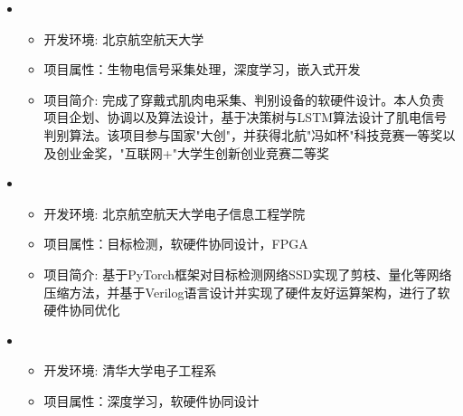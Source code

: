   \begin{itemize}[leftmargin=*]
    \item
      {\small
      \begin{itemize}
        \item 开发环境: 北京航空航天大学
        \item 项目属性：生物电信号采集处理，深度学习，嵌入式开发
        \item 项目简介: 完成了穿戴式肌肉电采集、判别设备的软硬件设计。本人负责项目企划、协调以及算法设计，基于决策树与LSTM算法设计了肌电信号判别算法。该项目参与国家"大创"，并获得北航"冯如杯"科技竞赛一等奖以及创业金奖，"互联网+"大学生创新创业竞赛二等奖
      \end{itemize}
      }
    \item
    {\small
    \begin{itemize}
      \item 开发环境: 北京航空航天大学电子信息工程学院
      \item 项目属性：目标检测，软硬件协同设计，FPGA
      \item 项目简介: 基于PyTorch框架对目标检测网络SSD实现了剪枝、量化等网络压缩方法，并基于Verilog语言设计并实现了硬件友好运算架构，进行了软硬件协同优化
    \end{itemize}
    }
    \item
    {\small
    \begin{itemize}
      \item 开发环境: 清华大学电子工程系
      \item 项目属性：深度学习，软硬件协同设计

\end{itemize}}
\end{itemize}
